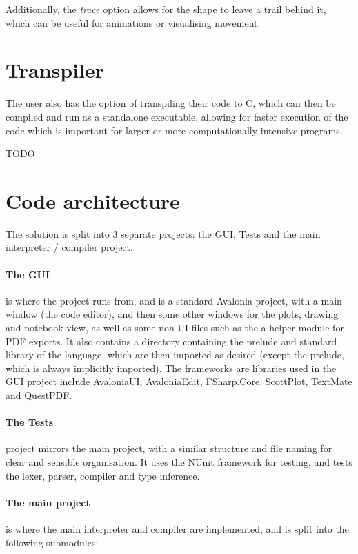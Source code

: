 Additionally, the \textit{trace} option allows for the shape to leave a trail behind it, which can be useful for
animations or visualising movement.

\section{Transpiler}\label{sec:transpiler}

The user also has the option of transpiling their code to C, which can then be compiled and run as a standalone
executable, allowing for faster execution of the code which is important for larger or more computationally
intensive programs.

TODO

\section{Code architecture}\label{sec:code-architecture}

The solution is split into 3 separate projects: the GUI, Tests and the main interpreter / compiler project.

\paragraph{The GUI} is where the project runs from, and is a standard Avalonia project, with a main window (the code editor), 
and then some other windows for the plots, drawing and notebook view, as well as some non-UI files such as the a helper 
module for PDF exports.
It also contains a directory containing the prelude and standard library of the language, which are then imported as 
desired (except the prelude, which is always implicitly imported).
The frameworks are libraries used in the GUI project include AvaloniaUI, AvaloniaEdit, FSharp.Core, ScottPlot, 
TextMate and QuestPDF\@. 

\paragraph{The Tests} project mirrors the main project, with a similar structure and file naming for clear and sensible
organisation.
It uses the NUnit framework for testing, and tests the lexer, parser, compiler and type inference.

\paragraph{The main project} is where the main interpreter and compiler are implemented, and is split into the following
submodules:

